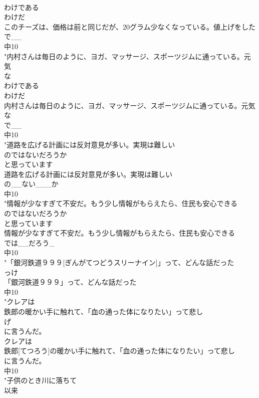 \documentclass[8pt]{extreport}
\begin{document}
\begin{CJK}{UTF8}{min}
\\	わけである
\\	わけだ
\\	このチーズは、価格は前と同じだが、20グラム少なくなっている。値上げをした
\\	で__
\\	中10
\\	"内村さんは毎日のように、ヨガ、マッサージ、スポーツジムに通っている。元気
\\	な
\\	わけである
\\	わけだ
\\	内村さんは毎日のように、ヨガ、マッサージ、スポーツジムに通っている。元気
\\	な
\\	で__
\\	中10
\\	"道路を広げる計画には反対意見が多い。実現は難しい
\\	のではないだろうか
\\	と思っています	
\\	道路を広げる計画には反対意見が多い。実現は難しい
\\	の__ない___か
\\	中10
\\	"情報が少なすぎて不安だ。もう少し情報がもらえたら、住民も安心できる
\\	のではないだろうか
\\	と思っています	
\\	情報が少なすぎて不安だ。もう少し情報がもらえたら、住民も安心できる
\\	では__だろう_
\\	中10
\\	"「銀河鉄道９９９[ぎんがてつどうスリーナイン]」って、どんな話だった
\\	っけ
\\	「銀河鉄道９９９」って、どんな話だった
\\	中10
\\	"クレアは
\\	鉄郎の暖かい手に触れて、「血の通った体になりたい」って悲し
\\	げ
\\	に言うんだ。
\\	クレアは
\\	鉄郎[てつろう]の暖かい手に触れて、「血の通った体になりたい」って悲し
\\	に言うんだ。
\\	中10
\\	"子供のとき川に落ちて
\\	以来

\end{CJK}
\end{document}
